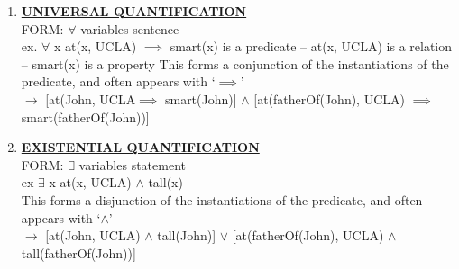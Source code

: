 \documentclass[../../lecture_notes.tex]{subfiles}
\begin{document}
	\begin{enumerate} [itemsep=0mm]
		\item \textbf{\underline{UNIVERSAL QUANTIFICATION}}\\
			FORM: $\forall$ variables sentence\\
			ex. $\forall$ x at(x, UCLA) $\implies$ smart(x) is a predicate
				-- at(x, UCLA) is a relation
				-- smart(x) is a property
			This forms a conjunction of the instantiations of the predicate, and often appears with ‘$\implies$’\\
			$\rightarrow$	[at(John, UCLA$\implies$ smart(John)] $\land$ 
						[at(fatherOf(John), UCLA) $\implies$ smart(fatherOf(John))]
		\item \textbf{\underline{EXISTENTIAL QUANTIFICATION}}\\
			FORM: $\exists$ variables statement\\
			ex $\exists$ x at(x, UCLA) $\land$ tall(x)\\
			This forms a disjunction of the instantiations of the predicate, and often appears with ‘$\land$’\\
			$\rightarrow$ [at(John, UCLA) $\land$ tall(John)] $\lor$ 
						 [at(fatherOf(John), UCLA) $\land$ tall(fatherOf(John))]
	\end{enumerate}
\end{document}
